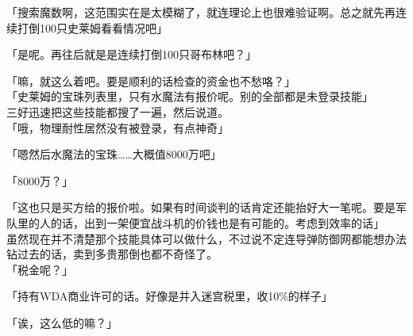 「搜索魔数啊，这范围实在是太模糊了，就连理论上也很难验证啊。总之就先再连续打倒100只史莱姆看看情况吧」

「是呢。再往后就是是连续打倒100只哥布林吧？」

「嘛，就这么着吧。要是顺利的话检查的资金也不愁咯？」\\

「史莱姆的宝珠列表里，只有水魔法有报价呢。别的全部都是未登录技能」\\

三好迅速把这些技能都搜了一遍，然后说道。\\

「哦，物理耐性居然没有被登录，有点神奇」

「嗯然后水魔法的宝珠……大概值8000万吧」

「8000万？」

「这也只是买方给的报价啦。如果有时间谈判的话肯定还能抬好大一笔呢。要是军队里的人的话，出到一架便宜战斗机的价钱也是有可能的。考虑到效率的话」\\

虽然现在并不清楚那个技能具体可以做什么，不过说不定连导弹防御网都能想办法钻过去的话，卖到多贵那倒也都不奇怪了。\\

「税金呢？」

「持有WDA商业许可的话。好像是并入迷宫税里，收10\%的样子」

「诶，这么低的嘛？」

